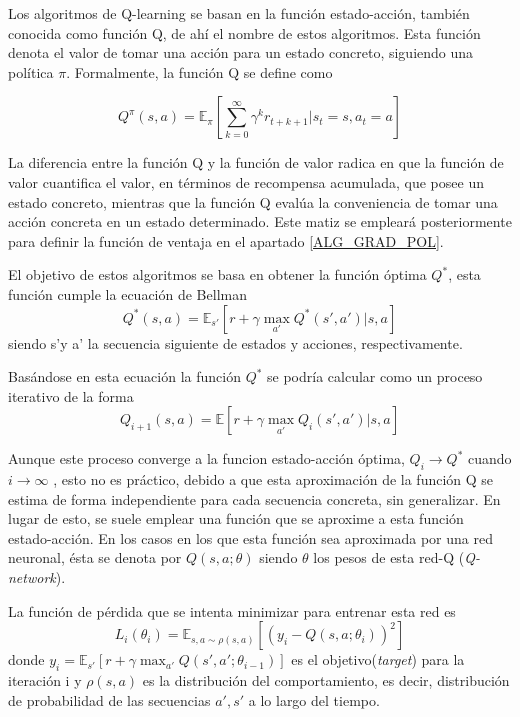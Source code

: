Los algoritmos de Q-learning se basan en la función estado-acción, también conocida como función Q, de ahí el nombre de estos algoritmos. Esta función denota el valor de tomar una acción para un estado concreto, siguiendo una política $\pi$. Formalmente, la función Q se define como

\begin{equation}
	Q^\pi(s,a) =  \mathbb{E}_\pi\left[\sum_{k=0}^{\infty}{\gamma^k r_{t+k+1}}\Big|s_t=s,a_t = a\right]
\end{equation}

La diferencia entre la función Q y la función de valor radica en que la función de valor cuantifica el valor, en términos de recompensa acumulada, que posee un estado concreto, mientras que la función Q evalúa la conveniencia de tomar una acción concreta en un estado determinado. Este matiz se empleará posteriormente para definir la función de ventaja en el apartado \ref{ALG_GRAD_POL}.

El objetivo de estos algoritmos se basa en obtener la función óptima $Q^*$, esta función cumple la ecuación de Bellman 
	\begin{equation}
		Q^*(s,a)= \mathbb{E}_{s'}\left[r+\gamma\;\underset{a'}{\text{max}}\; Q^*(s',a')\big|s,a\right]
	\end{equation}
siendo s'y a' la secuencia siguiente de estados y acciones, respectivamente.

Basándose en esta ecuación la función $Q^*$ se podría calcular como un proceso iterativo de la forma
	\begin{equation}
	Q_{i+1}(s,a)= \mathbb{E}\left[r+\gamma\;\underset{a'}{\text{max}}\; Q_i(s',a')\big|s,a\right]
	\end{equation}

Aunque este proceso converge a la funcion estado-acción óptima, $Q_i \rightarrow Q^*$ cuando $i \rightarrow \infty$ \cite{sutton2018reinforcement}, esto no es práctico, debido a que esta aproximación de la función Q se estima de forma independiente para cada secuencia concreta, sin generalizar. En lugar de esto, se suele emplear una función que se aproxime a esta función estado-acción. En los casos en los que esta función sea aproximada por una red neuronal, ésta se denota por $Q(s,a; \theta)$ siendo $\theta$ los pesos de esta red-Q (\textit{Q-network}). 

La función de pérdida que se intenta minimizar para entrenar esta red es
\begin{equation}\label{eq:1}
	L_i(\theta_i) = \mathbb{E}_{s,a\sim\rho(s,a)}\left[\left(y_i - Q(s,a;\theta_i)\right)^2\right]
\end{equation} 
donde $y_i= \mathbb{E}_{s'}[ r + \gamma \; {\text{max}_{a'}} \; Q(s',a';\theta_{i-1})]$ es el objetivo(\textit{target}) para la iteración i y $\rho(s,a)$ es la distribución del comportamiento, es decir, distribución de probabilidad de las secuencias $a', s'$ a lo largo del tiempo.

